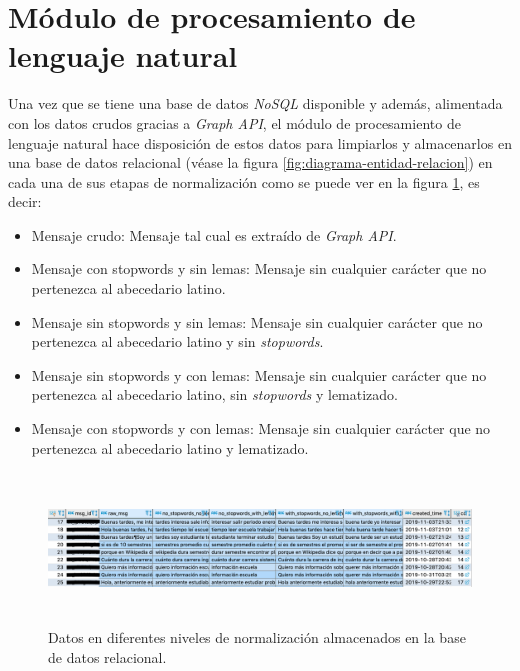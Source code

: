     \section{Módulo de procesamiento de lenguaje natural}
    Una vez que se tiene una base de datos \textit{NoSQL} disponible y además, alimentada con los datos crudos gracias a \textit{Graph API}, el módulo de procesamiento de lenguaje natural hace disposición de estos datos para limpiarlos y almacenarlos en una base de datos relacional (véase la figura \ref{fig:diagrama-entidad-relacion}) en cada una de sus etapas de normalización como se puede ver en la figura \ref{fig:sql-message-table}, es decir:
    \begin{itemize}
        \item Mensaje crudo: Mensaje tal cual es extraído de \textit{Graph API}.
        \item Mensaje con stopwords y sin lemas: Mensaje sin cualquier carácter que no pertenezca al abecedario latino.
        \item Mensaje sin stopwords y sin lemas: Mensaje sin cualquier carácter que no pertenezca al abecedario latino y sin \textit{stopwords}.
        \item Mensaje sin stopwords y con lemas: Mensaje sin cualquier carácter que no pertenezca al abecedario latino, sin \textit{stopwords} y lematizado. 
        \item Mensaje con stopwords y con lemas: Mensaje sin cualquier carácter que no pertenezca al abecedario latino y lematizado. 
    \end{itemize}
    
    \begin{figure}[H]
         \centering
         \includegraphics[height=4cm, width=16.5cm]{Latex/Classes/Imagenes/message-table.png}
         \caption{Datos en diferentes niveles de normalización almacenados en la base de datos relacional.}
         \label{fig:sql-message-table}
    \end{figure}

